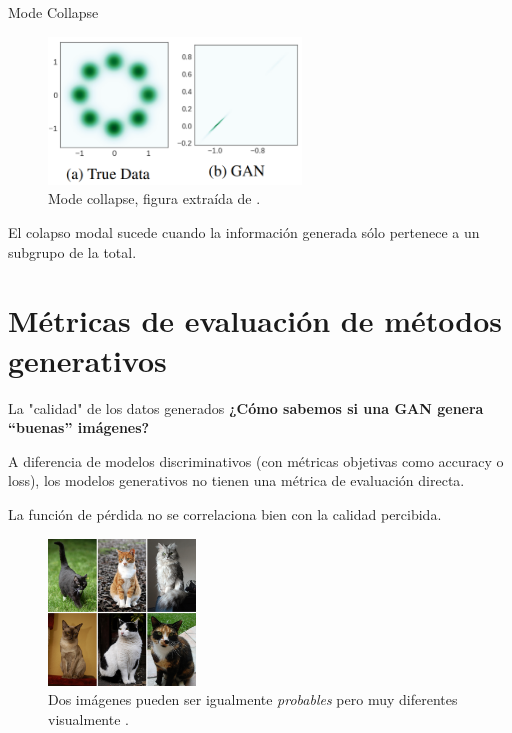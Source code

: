 \begin{frame}{Mode Collapse}

    \begin{figure}
        \centering
        \includegraphics[width=0.6\textwidth]{Slides/figures/GAN/Mode Collapse.png}
        \caption{Mode collapse, figura extraída de \cite{srivastava2017veegan}.}
    \end{figure}

    El \alert{colapso modal} sucede cuando la información generada sólo pertenece a un \alert{subgrupo} de la total.
    
\end{frame}

\section{Métricas de evaluación de métodos generativos}

\begin{frame}{La "calidad" de los datos generados}
\textbf{¿Cómo sabemos si una GAN genera “buenas” imágenes?}

A diferencia de modelos discriminativos (con métricas objetivas como accuracy o loss), los modelos generativos no tienen una métrica de evaluación directa.

La función de pérdida no se correlaciona bien con la calidad percibida.

\begin{figure}
    \centering
    \includegraphics[width=0.35\textwidth]{Slides/figures/GAN/gatos.jpg}
    \caption{Dos imágenes pueden ser igualmente \textit{probables} pero muy diferentes visualmente \cite{srivastava2017veegan}.}
\end{figure}
\end{frame}

